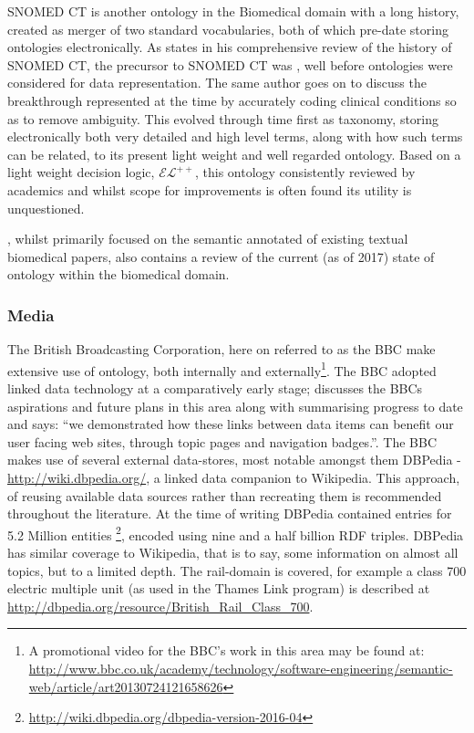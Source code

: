 SNOMED CT is another ontology in the Biomedical domain with a long history, created as merger of two standard vocabularies, both of which pre-date storing ontologies electronically. As \citet{Chute2000} states in his comprehensive review of the history of SNOMED CT, the precursor to SNOMED CT was , well before ontologies were considered for data representation. The same author goes on to discuss the breakthrough represented at the time by accurately coding clinical conditions so as to remove ambiguity. This evolved through time first as taxonomy, storing electronically both very detailed and high level terms, along with how such terms can be related, to its present light weight and well regarded ontology.  Based on a light weight decision logic, \(\mathcal{EL}^{++}\), this ontology consistently reviewed by academics and whilst scope for improvements is often found its utility is unquestioned. 

\citet{Jovanovic2017}, whilst primarily focused on the semantic annotated of existing textual biomedical papers, also contains a review of the current (as of 2017) state of ontology within the biomedical domain.

\subsubsection{Media}
\label{sec:media}
The British Broadcasting Corporation, here on referred to as the BBC make extensive use of ontology, both internally and externally\footnote{A promotional video  for the BBC's work in this area may be found at: \url{http://www.bbc.co.uk/academy/technology/software-engineering/semantic-web/article/art20130724121658626}}. The BBC adopted linked data technology at a comparatively early stage; \citet{Geo09} discusses the BBCs aspirations and future plans in this area along with summarising progress to date and says: ``we demonstrated how these links between data items can benefit our user facing web sites, through topic pages and navigation badges.''. The BBC makes use of several external data-stores, most notable amongst them DBPedia - \url{http://wiki.dbpedia.org/}, a linked data companion to Wikipedia. This approach, of reusing available data sources rather than recreating them is recommended throughout the literature. At the time of writing DBPedia contained  entries for 5.2 Million entities \footnote{\url{http://wiki.dbpedia.org/dbpedia-version-2016-04}}, encoded using nine and a half billion RDF triples. DBPedia has similar coverage to Wikipedia, that is to say, some information on almost all topics, but to a limited depth. The rail-domain is covered, for example a class 700 electric multiple unit (as used in the Thames Link program) is described at \url{http://dbpedia.org/resource/British_Rail_Class_700}.

